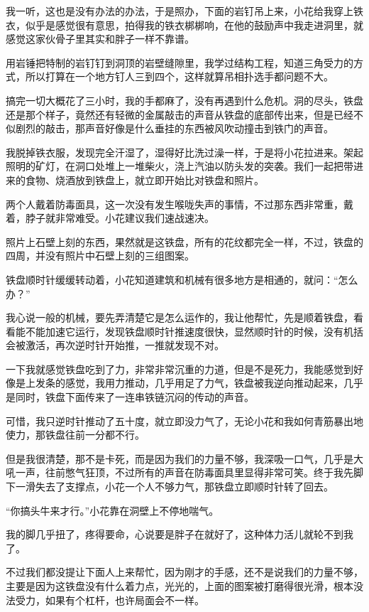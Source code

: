 我一听，这也是没有办法的办法，于是照办，下面的岩钉吊上来，小花给我穿上铁衣，似乎是感觉很有意思，拍得我的铁衣梆梆响，在他的鼓励声中我走进洞里，就感觉这家伙骨子里其实和胖子一样不靠谱。

用岩锤把特制的岩钉钉到洞顶的岩壁缝隙里，我学过结构工程，知道三角受力的方式，所以打算在一个地方钉人三到四个，这样就算吊相扑选手都问题不大。

搞完一切大概花了三小时，我的手都麻了，没有再遇到什么危机。洞的尽头，铁盘还是那个样子，竟然还有轻微的金属敲击的声音从铁盘的底部传出来，但是已经不似剧烈的敲击，那声音好像是什么垂挂的东西被风吹动撞击到铁门的声音。

我脱掉铁衣服，发现完全汗湿了，湿得好比洗过澡一样，于是将小花拉进来。架起照明的矿灯，在洞口处堆上一堆柴火，浇上汽油以防头发的突袭。我们一起把带进来的食物、烧酒放到铁盘上，就立即开始比对铁盘和照片。

两个人戴着防毒面具，这一次没有发生喉咙失声的事情，不过那东西非常重，戴着，脖子就非常难受。小花建议我们速战速决。

照片上石壁上刻的东西，果然就是这铁盘，所有的花纹都完全一样，不过，铁盘的四周，并没有照片中石壁上刻的三组图案。

铁盘顺时针缓缓转动着，小花知道建筑和机械有很多地方是相通的，就问：“怎么办？”

我心说一般的机械，要先弄清楚它是怎么运作的，我让他帮忙，先是顺着铁盘，看看能不能加速它运行，发现铁盘顺时针推速度很快，显然顺时针的时候，没有机括会被激活，再次逆时针开始推，一推就发现不对。

一下我就感觉铁盘吃到了力，非常非常沉重的力道，但是不是死力，我能感觉到好像是上发条的感觉，我用力推动，几乎用足了力气，铁盘被我逆向推动起来，几乎是同时，铁盘下面传来了一连串铁链沉闷的传动的声音。

可惜，我只逆时针推动了五十度，就立即没力气了，无论小花和我如何青筋暴出地使力，那铁盘往前一分都不行。

但是我很清楚，那不是卡死，而是因为我们的力量不够，我深吸一口气，几乎是大吼一声，往前憋气狂顶，不过所有的声音在防毒面具里显得非常可笑。终于我先脚下一滑失去了支撑点，小花一个人不够力气，那铁盘立即顺时针转了回去。

“你搞头牛来才行。”小花靠在洞壁上不停地喘气。

我的脚几乎扭了，疼得要命，心说要是胖子在就好了，这种体力活儿就轮不到我了。

不过我们都没提让下面人上来帮忙，因为刚才的手感，还不是说我们的力量不够，主要是因为这铁盘没有什么着力点，光光的，上面的图案被打磨得很光滑，根本没法受力，如果有个杠杆，也许局面会不一样。

